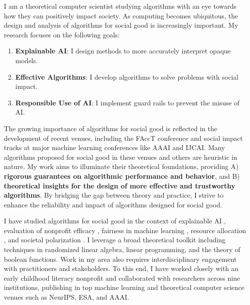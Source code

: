 \documentclass[11pt]{article}
\begin{document}
{\setlength{\parindent}{0cm}

I am a theoretical computer scientist studying algorithms with an eye towards how they can positively impact society.
As computing becomes ubiquitous, the design and analysis of algorithms for social good is increasingly important.
My research focuses on the following goals:
\begin{enumerate}
    \item \textbf{Explainable AI}: I design methods to more accurately interpret opaque models. %
    \item \textbf{Effective Algorithms}: I develop algorithms to solve problems with social impact. %
    \item \textbf{Responsible Use of AI}: I implement guard rails to prevent the misuse of AI. %
\end{enumerate}

The growing importance of algorithms for social good is reflected in the development of recent venues, including the FAccT conference and social impact tracks at major machine learning conferences like AAAI and IJCAI.
Many algorithms proposed for social good in these venues and others are heuristic in nature. My work aims to illuminate their theoretical foundations, providing A) \textbf{rigorous guarantees on algorithmic performance and behavior}, and B) \textbf{theoretical insights for the design of more effective and trustworthy algorithms}.
By bridging the gap between theory and practice, I strive to enhance the reliability and impact of algorithms designed for social good.

I have studied algorithms for social good in the context of explainable AI \cite{musco2024leverage,liu2024kernel}, evaluation of nonprofit efficacy \cite{witter2024benchmarking}, fairness in machine learning \cite{rosenblatt2023counterfactual,witter2024fairlyuncertain}, resource allocation \cite{hellerstein2022local,witter2024i,witter2024minimizing}, and societal polarization \cite{musco2022quantify}. I leverage a broad theoretical toolkit including techniques in randomized linear algebra, linear programming, and the theory of boolean functions. Work in my area also requires interdisciplinary engagement with practitioners and stakeholders. To this end, I have worked closely with an early childhood literacy nonprofit and collaborated with researchers across nine institutions, publishing in top machine learning and theoretical computer science venues such as NeurIPS, ESA, and AAAI.

}
\end{document}
